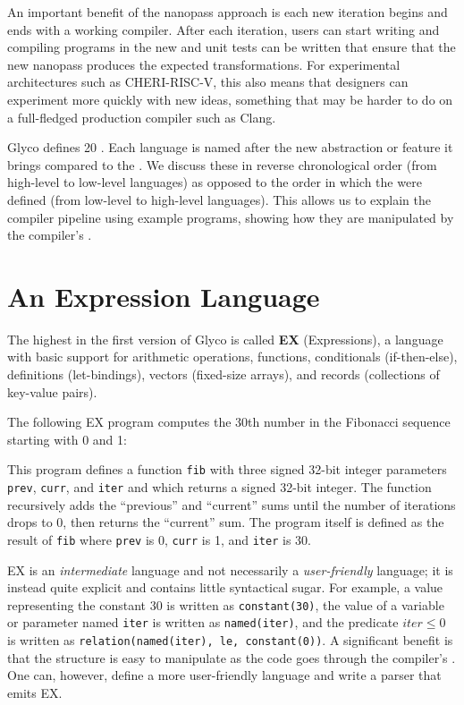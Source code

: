 \documentclass[main.tex]{subfiles}
\begin{document}
An important benefit of the nanopass approach is each new iteration begins and ends with a working compiler. After each iteration, users can start writing and compiling programs in the new \il{} and unit tests can be written that ensure that the new \gls{nanopass} produces the expected transformations. For experimental architectures such as CHERI-RISC-V, this also means that designers can experiment more quickly with new ideas, something that may be harder to do on a full-fledged production compiler such as Clang.

Glyco defines 20 . Each language is named after the new abstraction or feature it brings compared to the . We discuss these  in reverse chronological order (from high-level to low-level languages) as opposed to the order in which the  were defined (from low-level to high-level languages). This allows us to explain the compiler pipeline using example programs, showing how they are manipulated by the compiler's .

\section{An Expression Language}
The highest \il{} in the first version of Glyco is called \textbf{EX} (Expressions), a language with basic support for arithmetic operations, functions, conditionals (if-then-else), definitions (let-bindings), vectors (fixed-size arrays), and records (collections of key-value pairs).

The following EX program computes the 30th number in the Fibonacci sequence starting with 0 and 1:


This program defines a function \texttt{fib} with three signed 32-bit integer parameters \texttt{prev}, \texttt{curr}, and \texttt{iter} and which returns a signed 32-bit integer. The function recursively adds the \enquote{previous} and \enquote{current} sums until the number of iterations drops to 0, then returns the \enquote{current} sum. The program itself is defined as the result of \texttt{fib} where \texttt{prev} is 0, \texttt{curr} is 1, and \texttt{iter} is 30.

EX is an \emph{intermediate} language and not necessarily a \emph{user-friendly} language; it is instead quite explicit and contains little syntactical sugar. For example, a value representing the constant 30 is written as \texttt{constant(30)}, the value of a variable or parameter named \texttt{iter} is written as \texttt{named(iter)}, and the predicate $ \textit{iter} \le 0 $ is written as \texttt{relation(named(iter), le, constant(0))}. A significant benefit is that the structure is easy to manipulate as the code goes through the compiler's . One can, however, define a more user-friendly language and write a parser that emits EX.
\end{document}
